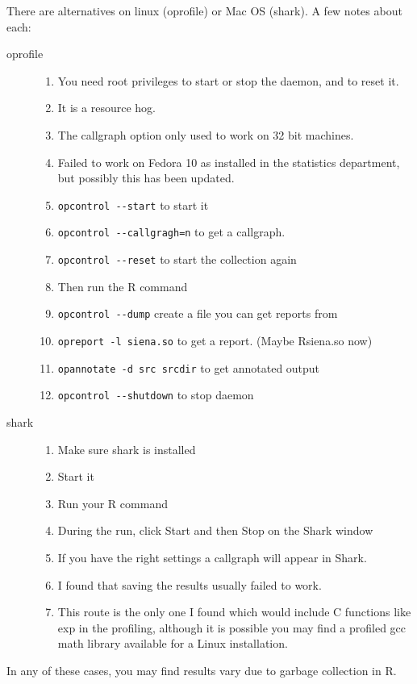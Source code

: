 \documentclass[12pt, a4paper]{article}
\renewcommand{\=}{\,=\,}
\newcommand{\+}{\,+\,}
\begin{document}
There are alternatives on linux (\textsf{oprofile}) or Mac OS (\textsf{shark}).
A few notes about each:
\begin{description}
\item[oprofile]
\begin{enumerate}
\item You need root privileges to start or stop the daemon, and to reset it.
\item It is a resource hog.
\item The callgraph option only used to work on 32 bit machines.
\item Failed to work on Fedora 10 as installed in the statistics department, but
  possibly this has been updated.
\item \verb|opcontrol --start| to start it
\item \verb|opcontrol --callgragh=n| to get a callgraph.
\item \verb|opcontrol --reset| to start the collection again
\item Then run the R command
\item \verb|opcontrol --dump| create a file you can get reports from
\item \verb|opreport -l siena.so| to get a report. (Maybe Rsiena.so now)
\item \verb|opannotate -d src srcdir| to get annotated output
\item \verb|opcontrol --shutdown| to stop daemon
\end{enumerate}
\item[shark]
\begin{enumerate}
\item Make sure shark is installed
\item Start it
\item Run your R command
\item During the run, click Start and then Stop  on the Shark window
\item If you have the right settings a callgraph will appear in Shark.
\item I found that saving the results usually failed to work.
\item This route is the only one I found which would include C functions like
  exp in the profiling, although it is possible you may find a profiled gcc
  math library available for a Linux installation.
\end{enumerate}
\end{description}

In any of these cases, you may find results vary due to garbage
collection in R.
\end{document}
